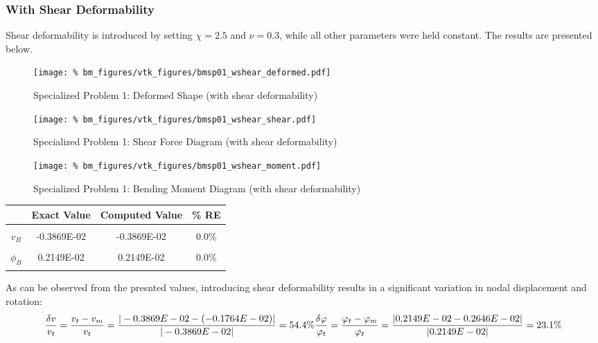 \subsubsection{With Shear Deformability}
\par
Shear deformability is introduced by setting $\chi=2.5$ and $\nu=0.3$, while all other parameters 
were held constant. The results are presented below.


\begin{figure}[!htb]
    \texttt{[image: \%
                     bm\_figures/vtk\_figures/bmsp01\_wshear\_deformed.pdf]}
    \centering
    \caption{Specialized Problem 1: Deformed Shape (with shear deformability)}
    \label{fig:bmsp01_wshear_deformed}
\end{figure}
\begin{figure}[!htb]
    \texttt{[image: \%
                     bm\_figures/vtk\_figures/bmsp01\_wshear\_shear.pdf]}
    \centering
    \caption{Specialized Problem 1: Shear Force Diagram (with shear deformability)}
    \label{fig:bmsp01_wshear_shear}
\end{figure}
\begin{figure}[!htb]
    \texttt{[image: \%
                     bm\_figures/vtk\_figures/bmsp01\_wshear\_moment.pdf]}
    \centering
    \caption{Specialized Problem 1: Bending Moment Diagram (with shear deformability)}
    \label{fig:bmsp01_wshear_moment}
\end{figure}
\begin{table}[h!]
\centering
\begin{tabular}{ c| c c c }
    & Exact Value & Computed Value & \% RE \\ \hline \\
    $v_B$  & -0.3869E-02 & -0.3869E-02 & 0.0\% \\ \\
    $\phi_B$ & 0.2149E-02 & 0.2149E-02 & 0.0\% \\ \\
\end{tabular}
\end{table}
\par
As can be observed from the presnted values, introducing shear deformability results in a 
significant variation in nodal displacement and rotation:
\begin{equation*}
    \dfrac{\delta v}{v_t} = \dfrac{v_t - v_m}{v_t} = %
        \dfrac{|-0.3869E-02 - (-0.1764E-02)|}{|-0.3869E-02|} = 54.4\% \\
    \dfrac{\delta \varphi}{\varphi_t} = \dfrac{\varphi_t - \varphi_m}{\varphi_t} = %
        \dfrac{|0.2149E-02 - 0.2646E-02|}{|0.2149E-02|} = 23.1\% 
\end{equation*}
